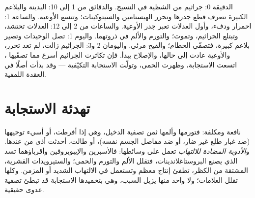 \begin{example}\label{ex:g12:innate-immunity:timetable}
الدقيقة 0: جراثيم من الشظية في النسيج. والدقائق من 1 إلى 10: 
البدينة والبلاعم الكبيرة تتعرف قطع جدرها وتحرر الهيستامين
والسيتوكينات؛ وتتسع الأوعية. والساعة 1: احمرار ودفء، وأول العدلات
تعبر جدر الأوعية. والساعات من 2 إلى 12: العدلات تحتشد، وتبتلع
الجراثيم، وتموت؛ والتورم والألم في ذروتهما. واليوم 1: تصل الوحيدات
وتصير بلاعم كبيرة، فتصفّي الحطام؛ والقيح مرئي. واليومان 2 و3: الجراثيم
زالت،  لم تعد تحرر، والأوعية عادت إلى حالها، والإصلاح يبدأ.
فإن تكاثرت الجراثيم أسرع مما تصفّيها ، اتسعت الاستجابة، وظهرت
الحمى، وتولّت الاستجابة التكيّفية --- وقد بدأت أصلًا في العقدة اللمفية.
\end{example}

\section{تهدئة الاستجابة}

\begin{proposition}\label{prop:g12:innate-immunity:drugs}
 نافعة ومكلفة: فتورمها وألمها ثمن تصفية الدخيل،
وهي إذا أفرطت، أو أسيء توجيهها (ضد غبار طلع غير ضار، أو ضد مفاصل الجسم
نفسه)، أو طالت، أحدثت أذى من عندها. و\emph{الأدوية المضادة
للالتهاب} تعمل على وسائطها: فالأسبرين
والإيبوبروفين وأقرباؤهما تسد  الذي يصنع البروستاغلاندينات،
فتقلل الألم والتورم والحمى؛ والستيرويدات القشرية، المشتقة من 
الكظر، تطفئ إنتاج معظم  وتستعمل في الالتهاب الشديد أو المزمن.
وكلها تقلل العلامات؛ ولا واحد منها يزيل السبب، وهي بتخميدها الاستجابة
قد تبطئ تصفية عدوى حقيقية.
\end{proposition}
\admitted

